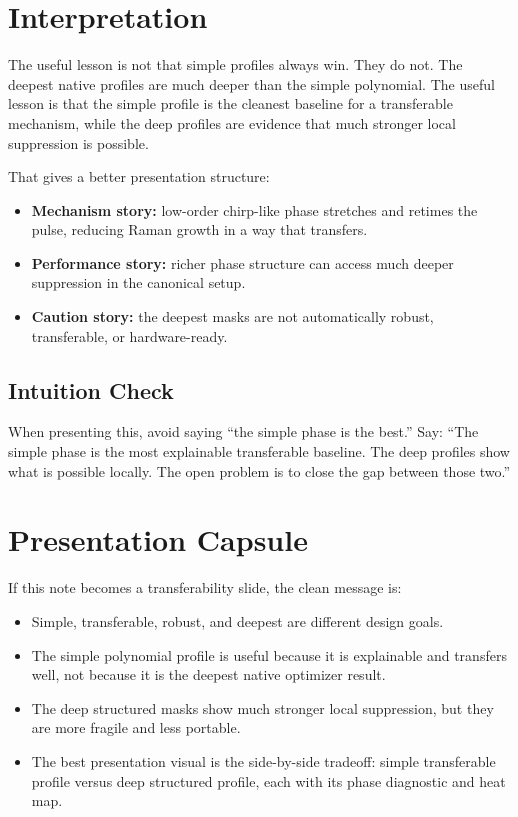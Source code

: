\documentclass[11pt]{article}
\begin{document}
\clearpage
\section{Interpretation}

The useful lesson is not that simple profiles always win. They do not. The
deepest native profiles are much deeper than the simple polynomial. The useful
lesson is that the simple profile is the cleanest baseline for a transferable
mechanism, while the deep profiles are evidence that much stronger local
suppression is possible.

That gives a better presentation structure:
\begin{itemize}
    \item \textbf{Mechanism story:} low-order chirp-like phase stretches and
    retimes the pulse, reducing Raman growth in a way that transfers.
    \item \textbf{Performance story:} richer phase structure can access much
    deeper suppression in the canonical setup.
    \item \textbf{Caution story:} the deepest masks are not automatically
    robust, transferable, or hardware-ready.
\end{itemize}

\subsection*{Intuition Check}

When presenting this, avoid saying ``the simple phase is the best.'' Say:
``The simple phase is the most explainable transferable baseline. The deep
profiles show what is possible locally. The open problem is to close the gap
between those two.''

\section{Presentation Capsule}

If this note becomes a transferability slide, the clean message is:
\begin{itemize}
    \item Simple, transferable, robust, and deepest are different design goals.
    \item The simple polynomial profile is useful because it is explainable and transfers well, not because it is the deepest native optimizer result.
    \item The deep structured masks show much stronger local suppression, but they are more fragile and less portable.
    \item The best presentation visual is the side-by-side tradeoff: simple transferable profile versus deep structured profile, each with its phase diagnostic and heat map.
\end{itemize}
\end{document}

